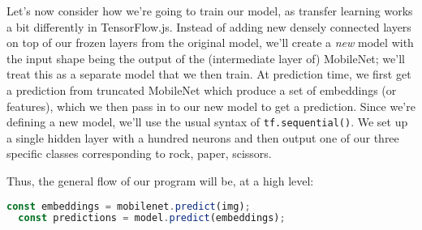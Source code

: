 \documentclass[12pt]{article}
\begin{document}
Let's now consider how we're going to train our model, as transfer learning works a bit differently in TensorFlow.js. Instead of adding new densely connected layers on top of our frozen layers from the original model, we'll create a \emph{new} model with the input shape being the output of the (intermediate layer of) MobileNet; we'll treat this as a separate model that we then train. At prediction time, we first get a prediction from truncated MobileNet which produce a set of embeddings (or features), which we then pass in to our new model to get a prediction. Since we're defining a new model, we'll use the usual syntax of \texttt{tf.sequential()}. We set up a single hidden layer with a hundred neurons and then output one of our three specific classes corresponding to rock, paper, scissors.

Thus, the general flow of our program will be, at a high level:
\begin{lstlisting}[language=JavaScript]
  const embeddings = mobilenet.predict(img);
  const predictions = model.predict(embeddings);
\end{lstlisting}
\end{document}
